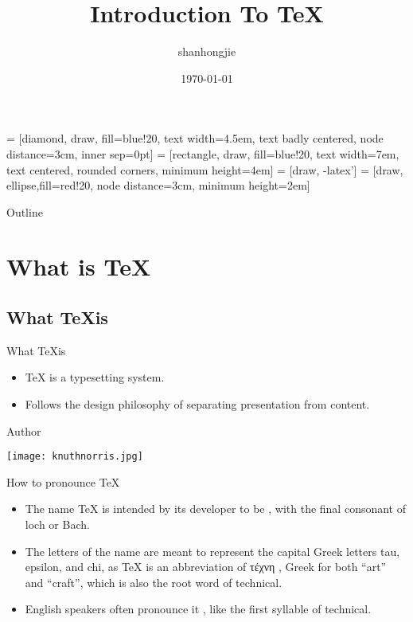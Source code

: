 \documentclass{beamer}
\title[What You Think Is What You Get] %
{Introduction To \TeX}
\author[shanhongjie] %
{shanhongjie}
\date[Short Occasion] %
{\today}
\begin{document}
 = [diamond, draw, fill=blue!20, 
    text width=4.5em, text badly centered, node distance=3cm, inner sep=0pt]
 = [rectangle, draw, fill=blue!20, 
    text width=7em, text centered, rounded corners, minimum height=4em]
 = [draw, -latex']
 = [draw, ellipse,fill=red!20, node distance=3cm,
    minimum height=2em]

\begin{frame}
  \titlepage
\end{frame}

\begin{frame}{Outline}
  \tableofcontents
\end{frame}




\section{What is \TeX}
\subsection{What \TeX is}
\begin{frame}{What \TeX is}
  \begin{itemize}
    \item \TeX{} is a typesetting system.
    \item Follows the design philosophy of separating presentation from content.
  \end{itemize}
\end{frame}
\begin{frame}{Author}
\begin{center}
  \texttt{[image: knuthnorris.jpg]}
\end{center}
\end{frame}
\begin{frame}{How to pronounce \TeX}
  \begin{itemize}
    \item The name \TeX{} is intended by its developer to be , with the final consonant of loch or Bach. 
    \item The letters of the name are meant to represent the capital Greek letters tau, epsilon, and chi, as \TeX{} is an abbreviation of  τέχνη , Greek for both ``art'' and ``craft'', which is also the root word of technical. 
    \item English speakers often pronounce it , like the first syllable of technical.
  \end{itemize}
\end{frame}
\end{document}
